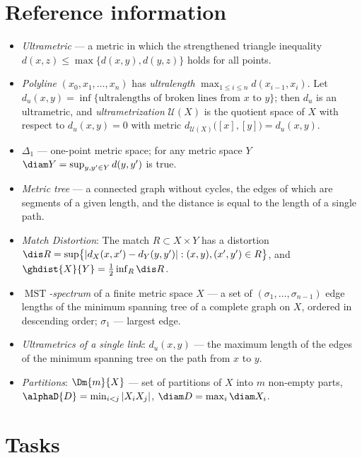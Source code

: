 \documentclass[a4paper,12pt]{report}
\begin{document}
\section*{Reference information}

\begin{itemize}[leftmargin=*]
\item \emph{Ultrametric} --- a metric in which the strengthened triangle inequality $d(x,z)\le\max\{d(x,y),d(y,z)\}$ holds for all points.
\item \emph{Polyline} $(x_0,x_1,\dots,x_n)$ has \emph{ultralength} $\max_{1\le i\le n}d(x_{i-1},x_i)$. Let $d_u(x,y)=\inf\{\text{ultralengths of broken lines from }x\text{ to }y\}$\textup{;} then $d_u$ is an ultrametric, and \emph{ultrametrization} $\mathcal U(X)$ is the quotient space of $X$ with respect to $d_u(x,y)=0$ with metric $d_{\mathcal U(X)}\bigl([x],[y]\bigr)=d_u(x,y)$.
\item $\Delta_1$ --- one-point metric space\textup{;} for any metric space $Y$ $\diam Y = \sup_{y,y'\in Y}d(y,y')$ is true.
\item \emph{Metric tree} --- a connected graph without cycles, the edges of which are segments of a given length, and the distance is equal to the length of a single path.
\item \emph{Match Distortion}: The match $R\subset X\times Y$ has a distortion $\dis R=\sup\bigl\{|d_X(x,x')-d_Y(y,y')|:(x,y),(x',y')\in R\bigr\}$, and $\ghdist{X}{Y}=\frac12\inf_R\dis R$.
\item \emph{$\operatorname{MST}$-spectrum} of a finite metric space $X$ --- a set of $(\sigma_1,\dots,\sigma_{n-1})$ edge lengths of the minimum spanning tree of a complete graph on $X$, ordered in descending order\textup{;} $\sigma_1$ --- largest edge.
\item \emph{Ultrametrics of a single link}: $d_u(x,y)$ --- the maximum length of the edges of the minimum spanning tree on the path from $x$ to $y$.
\item \emph{Partitions}: $\Dm{m}{X}$ --- set of partitions of $X$ into $m$ non-empty parts, $\alphaD{D}=\min_{i<j}|X_iX_j|$, $\diam D=\max_i\diam X_i$.
\end{itemize}

\section*{Tasks}
\end{document}
